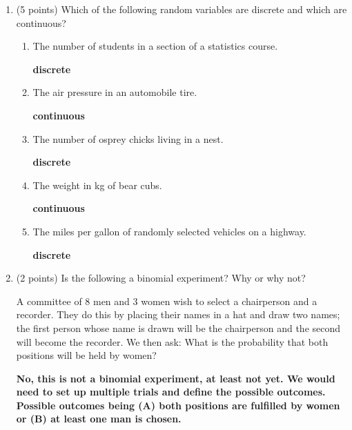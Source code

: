 \documentclass{article}
\begin{document}
\begin{enumerate}
	
\item (5 points) Which of the following random variables are discrete and which are
continuous?

	\begin{enumerate}
	
	\item The number of students in a section of a statistics course.
	
	\textbf{discrete} \\
	\item The air pressure in an automobile tire.
	
	\textbf{continuous} \\
	\item The number of osprey chicks living in a nest.
	
	\textbf{discrete} \\
	\item The weight in kg of bear cubs.
	
	\textbf{continuous} \\
	\item The miles per gallon of randomly selected vehicles on a highway. 
	
	\textbf{discrete} \\
	
	\end{enumerate}
	

	
	
	

	
\item (2 points) Is the following a binomial experiment? Why or why not?

A committee of 8 men and 3 women wish to select a chairperson and a recorder.
They do this by placing their names in a hat and draw two names; the first person
whose name is drawn will be the chairperson and the second will become the
recorder. We then ask: What is the probability that both positions will be held by
women?
		
\textbf{No, this is not a binomial experiment, at least not yet. We would need to set up multiple trials and define the possible outcomes. Possible outcomes being (A) both positions are fulfilled by women or (B) at least one man is chosen. }
	
	
	
	
	
\end{enumerate}
\end{document}
